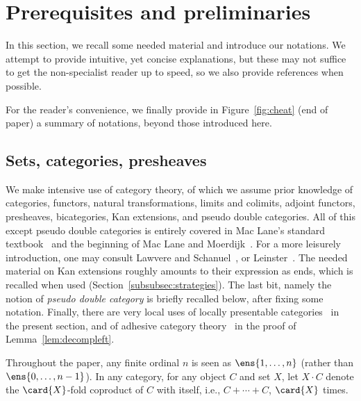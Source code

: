 \documentclass{LMCS}
\theoremstyle{plain}\newtheorem{satz}[thm]{Satz}
\begin{document}
\section{Prerequisites and preliminaries}\label{sec:prelim}
In this section, we recall some needed material and introduce our
notations.  We attempt to provide intuitive, yet concise explanations,
but these may not suffice to get the non-specialist reader up to
speed, so we also provide references when possible.

For the reader's convenience, we finally provide in
Figure~\ref{fig:cheat} (end of paper) a summary of notations, beyond
those introduced here.

\subsection{Sets, categories, presheaves}\label{subsec:prelim:cats}
We make intensive use of category theory, of which we assume prior
knowledge of categories, functors, natural transformations, limits and
colimits, adjoint functors, presheaves, bicategories, Kan extensions,
and pseudo double categories. All of this except pseudo double
categories is entirely covered in Mac Lane's standard
textbook~\cite{MacLane:cwm} and the beginning of Mac Lane and
Moerdijk~\cite{MM}. For a more leisurely introduction, one may consult
Lawvere and Schanuel~\cite{DBLP:books/daglib/0095291}, or
Leinster~\cite{LeinsterCats}.  The needed material on Kan extensions
roughly amounts to their expression as ends, which is recalled when
used (Section~\ref{subsubsec:strategies}).  The last bit, namely the
notion of \emph{pseudo double category} is briefly recalled below,
after fixing some notation.  Finally, there are very local uses of
locally presentable categories~\cite{Adamek} in the present section,
and of adhesive category theory~\cite{DBLP:conf/fossacs/LackS04} in
the proof of Lemma~\ref{lem:decompleft}.

Throughout the paper, any finite ordinal $n$ is seen as $\ens{1,
  \ldots, n}$ (rather than $\ens{0, \ldots, n-1}$).
In any category, for any object $C$ and set $X$, let $X \cdot C$
denote the $\card{X}$-fold coproduct of $C$ with itself, i.e., $C +
\cdots + C$, $\card{X}$ times.
\end{document}
